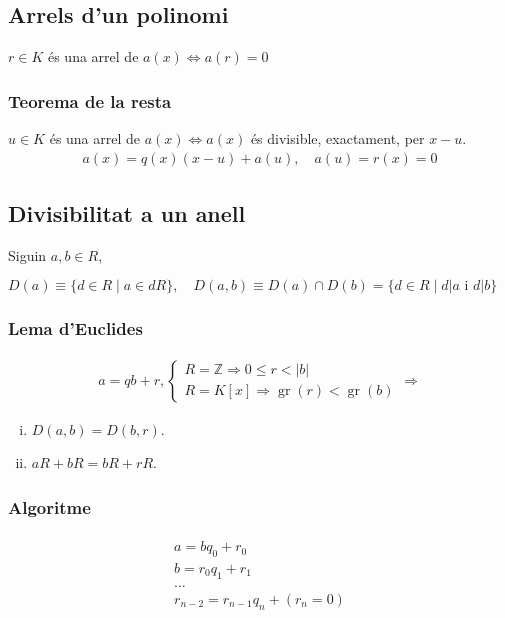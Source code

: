 \subsection{Arrels d'un polinomi}
$r \in K$ és una arrel de $a(x) \Leftrightarrow a(r) = 0$

\subsubsection*{Teorema de la resta}
$u \in K$ és una arrel de $a(x) \Leftrightarrow a(x)$ és divisible, exactament, per $x-u$.
\begin{align}
    a(x) = q(x) (x-u) + a(u), \quad a(u) = r(x) = 0
\end{align}

\subsection{Divisibilitat a un anell}
Siguin $a,b \in R$,

$D(a) \equiv \{ d \in R \mid a \in dR \}, \quad D(a,b) \equiv D(a) \cap D(b) = \{ d \in R \mid d|a \text{ i } d|b \}$

\subsubsection*{Lema d'Euclides}
\begin{align}
    a = qb + r,
    \begin{cases}
        R = \mathbb{Z} \Rightarrow 0 \leq r < |b| \\
        R = K [x] \Rightarrow \operatorname{gr} (r) < \operatorname{gr} (b)
    \end{cases}
    \Rightarrow
\end{align}

\begin{enumerate}[i)]
    \item $D (a,b) = D (b,r)$.
    \item $aR + bR = bR + rR$.
\end{enumerate}

\subsubsection*{Algoritme}
\begin{align}
\begin{gathered}
    a = b q_{0} + r_{0} \\
    b = r_{0} q_{1} + r_{1} \\
    \dots \\
    r_{n-2} = r_{n-1} q_{n} + (r_{n} = 0)
\end{gathered}
\end{align}

